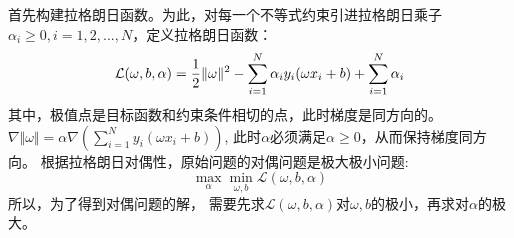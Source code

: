 \documentclass{progartcn}
\begin{document}
首先构建拉格朗日函数。为此，对每一个不等式约束引进拉格朗日乘子$\alpha_i\geq 0,i=1,2,...,N$，定义拉格朗日函数：
\begin{equation}
	\mathcal{L}(\omega,b,\alpha) = \frac{1}{2}\Vert \omega \Vert ^2 \\-\sum_{i=1}^{N}\alpha_iy_i(\omega x_i+b)+\sum_{i=1}^{N}\alpha_i
\end{equation}
其中，极值点是目标函数和约束条件相切的点，此时梯度是同方向的。$\nabla \Vert \omega \Vert = \alpha \nabla(\sum_{i=1}^{N}y_i(\omega x_i+b))$, 此时$\alpha$必须满足$\alpha\geq 0$，从而保持梯度同方向。
根据拉格朗日对偶性，原始问题的对偶问题是极大极小问题:
\begin{equation}
	\max_\alpha \min_{\omega,b}\mathcal{L}(\omega,b,\alpha)
\end{equation}
所以，为了得到对偶问题的解， 需要先求$\mathcal{L}(\omega,b,\alpha)$对$\omega,b$的极小，再求对$\alpha$的极大。
\end{document}
